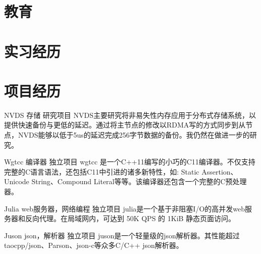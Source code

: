 \documentclass[11pt,a4paper]{moderncv}
\title{}               %
\begin{document}
\maketitle

\section{教育}

\section{实习经历}

\section{项目经历}
\renewcommand{\baselinestretch}{1.2}

{NVDS}
{存储}
{研究项目}{}
{NVDS主要研究将非易失性内存应用于分布式存储系统，以提供快速备份与更低的延迟。通过将主节点的修改以RDMA写的方式同步到从节点，NVDS能够以低于5us的延迟完成256字节数据的备份。我仍然在做进一步的研究。}

{Wgtcc}
{编译器}
{独立项目}{}
{wgtcc 是一个C++11编写的小巧的C11编译器。不仅支持完整的C语言语法，还包括C11中引进的诸多新特性，如: Static Assertion、Unicode String、Compound Literal等等。该编译器还包含一个完整的C预处理器。}

\vspace*{0.2\baselineskip}
{Julia}
{web服务器，网络编程}
{独立项目}{}
{julia是一个基于非阻塞I/O的高并发web服务器和反向代理。在局域网内，可达到 50K QPS 的 1KiB 静态页面访问。}

\vspace*{0.2\baselineskip}
{Juson}
{json，解析器}
{独立项目}{}
{juson是一个轻量级的json解析器。其性能超过 taocpp/json、Parson、json-c等众多C/C++ json解析器。}

\end{document}
